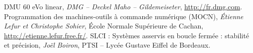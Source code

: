 \documentclass[10pt,oneside]{article}
\begin{document}
\begin{thebibliography}{2}
    DMU 60 eVo linear, \textit{DMG -- Deckel Maho -- Gildemeiseter}, \url{http://fr.dmg.com}.
    Programmation des machines-outils à commande numérique (MOCN), \textit{Étienne Lefur et Christophe Sohier}, École Normale Supérieure de Cachan, \url{http://etienne.lefur.free.fr/}.
    SLCI : Systèmes asservis en boucle fermée : stabilité et précision, \textit{Joël Boiron}, PTSI -- Lycée Gustave Eiffel de Bordeaux.

\end{thebibliography}
\end{document}
